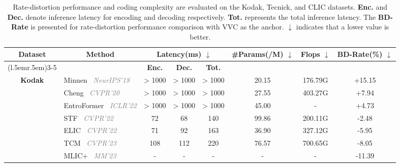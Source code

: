 \begin{table*}[t]
\centering
\setlength{\tabcolsep}{8pt}
\renewcommand{\arraystretch}{1.05}
\caption{
Rate-distortion performance and coding complexity are evaluated on the Kodak, Tecnick, and CLIC datasets.
\textbf{Enc.} and \textbf{Dec.} denote inference latency for encoding and decoding respectively.
\textbf{Tot.} represents the total inference latency.
The \textbf{BD-Rate} is presented for rate-distortion performance comparison with VVC as the anchor. 
$\downarrow$ indicates that a lower value is better.
}
\begin{tabular}{clcccccc}
\toprule
\multicolumn{1}{c}{\multirow{2}{*}{\textbf{Dataset}}}  & \multicolumn{1}{c}{\multirow{2}{*}{\textbf{Method}}}  & \multicolumn{3}{c}{\textbf{Latency(ms)} $\downarrow$}& \multirow{2}{*}{\textbf{\#Params(/M)} $\downarrow$}& \multirow{2}{*}{\textbf{Flops} $\downarrow$} & \multirow{2}{*}{\textbf{BD-Rate(\%)} $\downarrow$} \\ \cmidrule(l{.5em}r{.5em}){3-5}
  & & \textbf{Enc.}& \textbf{Dec.} & \textbf{Tot.}\\  \midrule \midrule    
\multicolumn{1}{c}{\multirow{11}{*}{\textbf{Kodak}}}  & Minnen~\cite{minnen2018joint} \textcolor{gray}{\textit{NeurIPS'18}}& \textgreater{} 1000 &  \textgreater{} 1000& \textgreater{} 1000 & 20.15 &  176.79G &  \cellcolor[HTML]{EFEFEF} +15.15\\
\multicolumn{1}{c}{}  & Cheng~\cite{cheng2020learned} \textcolor{gray}{\textit{CVPR'20}}& \textgreater{} 1000 &   \textgreater{} 1000&  \textgreater{} 1000 &  27.55  &   403.27G & \cellcolor[HTML]{EFEFEF} +7.94\\
\multicolumn{1}{c}{}  & EntroFormer~\cite{qian2021entroformer} \textcolor{gray}{\textit{ICLR'22}}& \textgreater{} 1000&   \textgreater{} 1000&   \textgreater{} 1000 &  45.00&  - &  \cellcolor[HTML]{EFEFEF} +4.73\\
\multicolumn{1}{c}{}  & STF~\cite{zou2022devil} \textcolor{gray}{\textit{CVPR'22}}   & 72&    68&   140 &  99.86     &  200.11G & \cellcolor[HTML]{EFEFEF} -2.48\\
\multicolumn{1}{c}{}  & ELIC~\cite{he2022elic} \textcolor{gray}{\textit{CVPR'22}}   & 71&    92&   163 &  36.90&  327.12G &  \cellcolor[HTML]{EFEFEF} -5.95\\
\multicolumn{1}{c}{}  & TCM~\cite{liu2023learned} \textcolor{gray}{\textit{CVPR'23}}   & 108&   112&   220 &  76.57&  700.65G &  \cellcolor[HTML]{EFEFEF} -8.05\\
\multicolumn{1}{c}{}  & MLIC+~\cite{jiang2023mlic} \textcolor{gray}{\textit{MM'23}}      &     -&   -&    -&    -&  -&  \cellcolor[HTML]{EFEFEF} -11.39\\

\end{tabular}
\end{table*}

